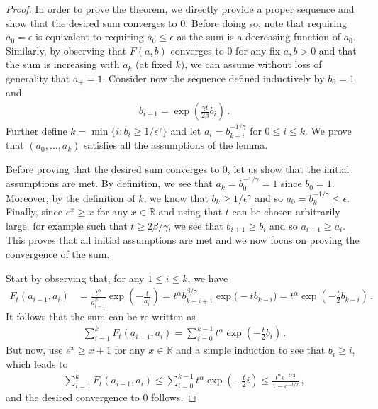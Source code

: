 \documentclass{article}
\newcommand{\1}{\mathbbm{1}}								%
\theoremstyle{definition}
\numberwithin{equation}{section}
\newcommand{\R}{\mathbb R}
\begin{document}
\begin{proof}
    In order to prove the theorem, we directly provide a proper sequence and show that the desired sum converges to $0$.
    Before doing so, note that requiring $a_0=\epsilon$ is equivalent to requiring $a_0\leq\epsilon$ as the sum is a decreasing function of $a_0$.
    Similarly, by observing that $F(a,b)$ converges to $0$ for any fix $a,b>0$ and that the sum is increasing with $a_k$ (at fixed $k$), we can assume without loss of generality that $a_+=1$.
    Consider now the sequence defined inductively by $b_0=1$ and
    \begin{align*}
        b_{i+1}=\exp\left(\frac{\gamma t}{2\beta}b_i\right)\,.
    \end{align*}
    Further define $k=\min\{i:b_i\geq1/\epsilon^\gamma\}$ and let $a_i=b_{k-i}^{-1/\gamma}$ for $0\leq i\leq k$.
    We prove that $(a_0,\ldots,a_k)$ satisfies all the assumptions of the lemma.

    Before proving that the desired sum converges to $0$, let us show that the initial assumptions are met.
    By definition, we see that $a_k=b_0^{-1/\gamma}=1$ since $b_0=1$.
    Moreover, by the definition of $k$, we know that $b_k\geq1/\epsilon^\gamma$ and so $a_0=b_k^{-1/\gamma}\leq\epsilon$.
    Finally, since $e^x\geq x$ for any $x\in\R$ and using that $t$ can be chosen arbitrarily large, for example such that $t\geq2\beta/\gamma$, we see that $b_{i+1}\geq b_i$ and so $a_{i+1}\geq a_i$.
    This proves that all initial assumptions are met and we now focus on proving the convergence of the sum.

    Start by observing that, for any $1\leq i\leq k$, we have
    \begin{align*}
        F_t(a_{i-1},a_i)&=\frac{t^\alpha}{a_{i-1}^\beta}\exp\left(-\frac{t}{a_i^\gamma}\right)=t^\alpha b_{k-i+1}^{\beta/\gamma}\exp\Big(-tb_{k-i}\Big)=t^\alpha\exp\left(-\frac{t}{2}b_{k-i}\right)\,.
    \end{align*}
    It follows that the sum can be re-written as
    \begin{align*}
        \sum_{i=1}^kF_t(a_{i-1},a_i)=\sum_{i=0}^{k-1}t^\alpha\exp\left(-\frac{t}{2}b_i\right)\,.
    \end{align*}
    But now, use $e^x\geq x+1$ for any $x\in\R$ and a simple induction to see that $b_i\geq i$, which leads to
    \begin{align*}
        \sum_{i=1}^kF_t(a_{i-1},a_i)\leq\sum_{i=0}^{k-1}t^\alpha\exp\left(-\frac{t}{2}i\right)\leq\frac{t^\alpha e^{-t/2}}{1-e^{-t/2}}\,,
    \end{align*}
    and the desired convergence to $0$ follows.
\end{proof}
\end{document}
